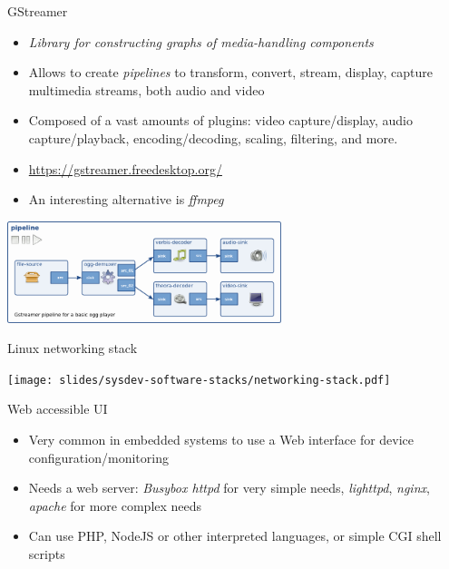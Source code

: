 \begin{frame}{GStreamer}
  \begin{itemize}
  \item {\em Library for constructing graphs of media-handling components}
  \item Allows to create {\em pipelines} to transform, convert,
    stream, display, capture multimedia streams, both audio and video
  \item Composed of a vast amounts of plugins: video capture/display,
    audio capture/playback, encoding/decoding, scaling, filtering, and
    more.
  \item \url{https://gstreamer.freedesktop.org/}
  \item An interesting alternative is {\em ffmpeg}
  \end{itemize}

  \begin{center}
    \includegraphics[width=0.6\textwidth]{slides/sysdev-software-stacks/gstreamer-pipeline.png}
  \end{center}
\end{frame}

\begin{frame}{Linux networking stack}
  \begin{center}
    \texttt{[image: slides/sysdev-software-stacks/networking-stack.pdf]}
  \end{center}
\end{frame}

\begin{frame}{Web accessible UI}
  \begin{itemize}
  \item Very common in embedded systems to use a Web interface for
    device configuration/monitoring
  \item Needs a web server: {\em Busybox httpd} for very simple needs,
    {\em lighttpd}, {\em nginx}, {\em apache} for more complex needs
  \item Can use PHP, NodeJS or other interpreted languages, or simple
    CGI shell scripts
  \end{itemize}
\end{frame}


